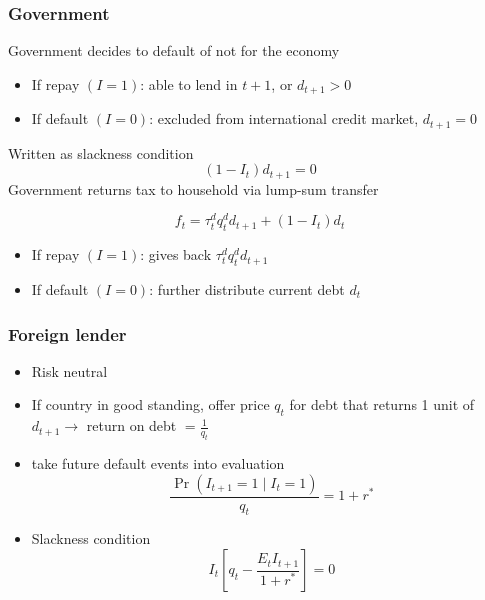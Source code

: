 \documentclass[mathserif]{beamer}
\begin{document}
    \begin{frame}
        \frametitle{Government}

        Government decides to default of not for the economy
        \begin{itemize}
            \item If repay $(I=1)$: able to lend in $t+1$, or $d_{t+1} > 0$
            \item If default $(I=0)$: excluded from international credit market, $d_{t+1} = 0$
        \end{itemize}
        Written as slackness condition
        \begin{equation}
            \label{eq:gov-next-debt}
            (1 - I_t)d_{t+1} = 0
        \end{equation}
        \vfill
        Government returns tax to household via lump-sum transfer

        \begin{equation}
            \label{eq:gov-budget}
            f_t = \tau_t^d q_t^d d_{t+1} + (1-I_t)d_t
        \end{equation}
        \begin{itemize}
            \item If repay $(I=1)$: gives back $\tau_t^d q_t^d d_{t+1}$
            \item If default $(I=0)$: further distribute current debt $d_t$
        \end{itemize}

    \end{frame}

    \begin{frame}
        \frametitle{Foreign lender}

        \begin{itemize}
            \item Risk neutral
            \item If country in good standing, offer price $q_t$ for debt that returns 1 unit of $d_{t+1} \rightarrow$ return on debt $=\frac{1}{q_t}$
            \item take future default events into evaluation
                \begin{equation}
                    \label{eq:lender}
                    \frac{\Pr(I_{t+1}=1 \mid I_{t}=1)}{q_t} = 1 + r^*
                \end{equation}
            \item Slackness condition
                \begin{equation*}
                    I_t \left[ q_t - \frac{E_t I_{t+1}}{1+r^*} \right] = 0
                \end{equation*}

        \end{itemize}

    \end{frame}
\end{document}
